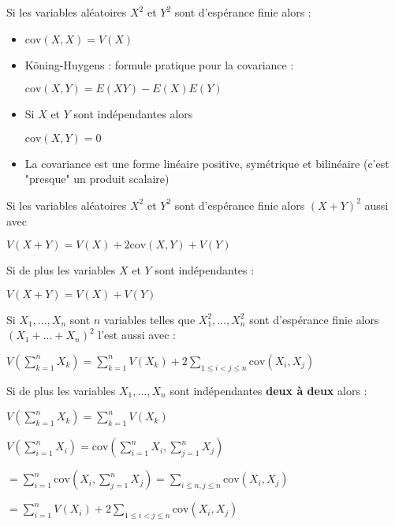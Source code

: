 \documentclass[a4paper,12pt]{book}
\newcommand{\Prop}[2]{\begin{tcolorbox}[sharp corners, colback=white,colframe=red!90!black!75, title=Proposition : #1]#2\end{tcolorbox}}
\newcommand{\Pre}[1]{\begin{tcolorbox}[sharp corners, colback=white,colframe=green!60!green!30!black!75, title=Preuve]#1\end{tcolorbox}}
\begin{document}
\Prop{de la covariance}{Si les variables aléatoires $X^2$ et $Y^2$ sont d'espérance finie alors :\begin{itemize}
\item \begin{center}$\mathrm{cov}(X,X)=V(X)$\end{center}
\item Köning-Huygens : formule pratique pour la covariance :\par\begin{center}$\mathrm{cov}(X,Y)=E(XY)-E(X)E(Y)$\end{center}
\item Si $X$ et $Y$ sont indépendantes alors \par\begin{center}$\mathrm{cov}(X,Y)=0$\end{center}
\item La covariance est une forme linéaire positive, symétrique et bilinéaire (c'est "presque" un produit scalaire)
\end{itemize}}
\Prop{Variance d'une somme}{Si les variables aléatoires $X^2$ et $Y^2$ sont d'espérance finie alors $(X+Y)^2$ aussi avec
\par\begin{center}$V(X+Y)=V(X)+2\mathrm{cov}(X,Y)+V(Y)$\end{center}
\par Si de plus les variables $X$ et $Y$ sont indépendantes :
\par\begin{center}$V(X+Y)=V(X)+V(Y)$\end{center}}
\Prop{Variance d'une somme}{Si $X_1,...,X_n$ sont $n$ variables telles que $X_1^2,..., X_n^2$ sont d'espérance finie alors $(X_1+...+X_n)^2$ l'est aussi avec :
\par\begin{center}$V\left(\sum\limits_{k=1}^nX_k\right)=\sum\limits_{k=1}^nV(X_k)+2\sum\limits_{1\leq i<j\leq n}\mathrm{cov}(X_i, X_j)$\end{center}
\par Si de plus les variables $X_1,...,X_n$ sont indépendantes \textbf{deux à deux} alors :
\par\begin{center}$V\left(\sum\limits_{k=1}^nX_k\right)=\sum\limits_{k=1}^nV(X_k)$\end{center}}
\Pre{$V(\sum\limits_{i=1}^n X_i) = \mathrm{cov}(\sum\limits_{i=1}^n X_i, \sum\limits_{j=1}^nX_j)$
\par $ = \sum\limits_{i=1}^n\mathrm{cov}(X_i, \sum\limits_{j=1}^nX_j) = \sum\limits_{i\leq n,j\leq n} \mathrm{cov}(X_i, X_j)$
\par $ = \sum\limits_{i=1}^nV(X_i) +2\sum\limits_{1\leq i<j\leq n}\mathrm{cov}(X_i, X_j)$}
\end{document}
